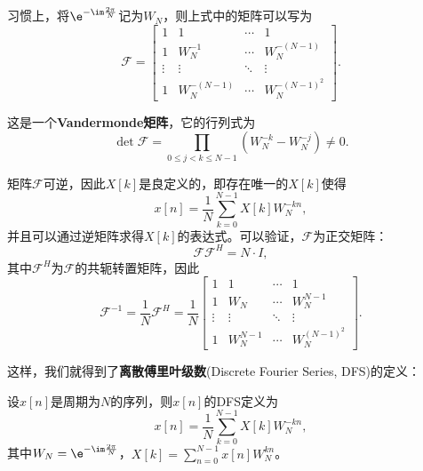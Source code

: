 习惯上，将$\e^{-\im\frac{2\pi}{N}}$记为$W_N$，则上式中的矩阵可以写为
\begin{equation}
    \mathcal{F}=\begin{bmatrix}
        1      & 1            & \cdots & 1            \\
        1      & W_N^{-1}     & \cdots & W_N^{-(N-1)} \\
        \vdots & \vdots       & \ddots & \vdots       \\
        1      & W_N^{-(N-1)} & \cdots & W_N^{-(N-1)^2}
    \end{bmatrix}.
\end{equation}

这是一个\textbf{Vandermonde矩阵}，它的行列式为
\begin{equation}
    \det\mathcal{F}=\prod_{0\leq j<k\leq N-1}(W_N^{-k}-W_N^{-j})\neq 0.
\end{equation}

矩阵$\mathcal{F}$可逆，因此$X[k]$是良定义的，即存在唯一的$X[k]$使得
\begin{equation}
    x[n]=\frac{1}{N}\sum_{k=0}^{N-1}X[k]W_N^{-kn},
\end{equation}
并且可以通过逆矩阵求得$X[k]$的表达式。可以验证，$\mathcal{F}$为正交矩阵：
\begin{equation}
    \mathcal{F}\mathcal{F}^H=N\cdot I,
\end{equation}
其中$\mathcal{F}^H$为$\mathcal{F}$的共轭转置矩阵，因此
\begin{equation}
    \mathcal{F}^{-1}=\frac{1}{N}\mathcal{F}^H=\frac{1}{N}
    \begin{bmatrix}
        1      & 1         & \cdots & 1           \\
        1      & W_N       & \cdots & W_N^{N-1}   \\
        \vdots & \vdots    & \ddots & \vdots      \\
        1      & W_N^{N-1} & \cdots & W_N^{(N-1)^2}
    \end{bmatrix}.
\end{equation}

这样，我们就得到了\textbf{离散傅里叶级数}(Discrete Fourier Series, DFS)的定义：
\begin{definition}[离散傅里叶级数]
    设$x[n]$是周期为$N$的序列，则$x[n]$的DFS定义为
    \begin{equation}
        x[n]=\frac{1}{N}\sum_{k=0}^{N-1}X[k]W_N^{-kn},
    \end{equation}
    其中$W_N=\e^{-\im\frac{2\pi}{N}}$，$X[k]=\sum_{n=0}^{N-1}x[n]W_N^{kn}$。
\end{definition}

